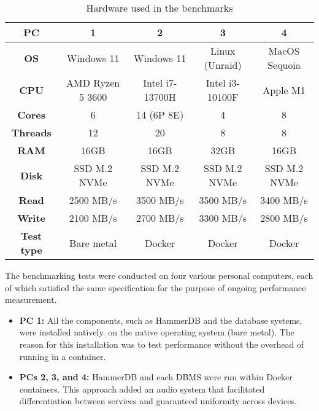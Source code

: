 \begin{table}[h!]
    \centering
    \begin{tabular}{|c|c|c|c|c|}
        \hline
        \textbf{PC}        & \textbf{1}       & \textbf{2}      & \textbf{3}      & \textbf{4}    \\
        \hline
        \textbf{OS}        & Windows 11       & Windows 11      & Linux (Unraid)  & MacOS Sequoia \\
        \hline
        \textbf{CPU}       & AMD Ryzen 5 3600 & Intel i7-13700H & Intel i3-10100F & Apple M1      \\
        \hline
        \textbf{Cores}     & 6                & 14 (6P 8E)      & 4               & 8             \\
        \hline
        \textbf{Threads}   & 12               & 20              & 8               & 8             \\
        \hline
        \textbf{RAM}       & 16GB             & 16GB            & 32GB            & 16GB          \\
        \hline
        \textbf{Disk}      & SSD M.2 NVMe     & SSD M.2 NVMe    & SSD M.2 NVMe    & SSD M.2 NVMe  \\
        \hline
        \textbf{Read}      & 2500 MB/s        & 3500 MB/s       & 3500 MB/s       & 3400 MB/s     \\
        \hline
        \textbf{Write}     & 2100 MB/s        & 2700 MB/s       & 3300 MB/s       & 2800 MB/s     \\
        \hline
        \textbf{Test type} & Bare metal       & Docker          & Docker          & Docker        \\
        \hline
    \end{tabular}
    \caption{Hardware used in the benchmarks}
    \label{tab:hardware-setup}
\end{table}

The benchmarking tests were conducted on four various personal computers, each of which satisfied the same specification for the purpose of ongoing performance measurement.

\begin{itemize}
    \setlength\itemsep{0.1em}
    \item \textbf{PC 1:} All the components, such as HammerDB and the database systems, were installed natively.
    on the native operating system (bare metal). The reason for this installation was to test performance without the overhead of running in a container.
    
    \item \textbf{PCs 2, 3, and 4:} HammerDB and each DBMS were run within Docker containers. This approach added an audio system that facilitated differentiation between services and guaranteed uniformity across devices.
\end{itemize}

